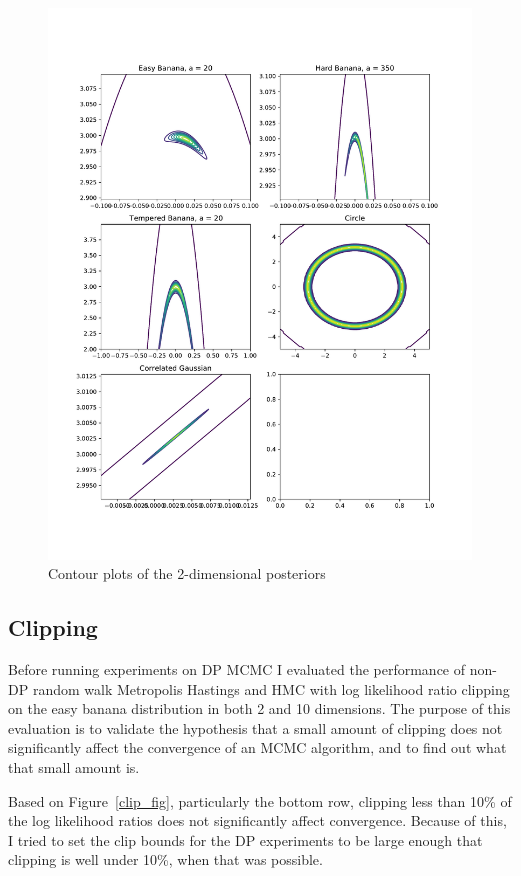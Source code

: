 ﻿\documentclass[a4paper]{article}
\begin{document}
\begin{figure}
  \centering
  \includegraphics[width=\textwidth]{figures/posterior_plots}
  \caption{Contour plots of the 2-dimensional posteriors}
  \label{post_plots_fig}
\end{figure}

\subsection{Clipping}
Before running experiments on DP MCMC I evaluated the performance of
non-DP random walk Metropolis Hastings and HMC with log likelihood ratio clipping
on the easy banana distribution in both 2 and 10 dimensions. The purpose
of this evaluation is to validate the hypothesis that a small amount
of clipping does not significantly affect the convergence of an
MCMC algorithm, and to find out what that small amount is.

Based on Figure~\ref{clip_fig}, particularly
the bottom row, clipping less than 10\% of the log likelihood ratios
does not significantly affect convergence. Because of this, I tried to
set the clip bounds for the DP experiments to be large enough that
clipping is well under 10\%, when that was possible.
\end{document}
